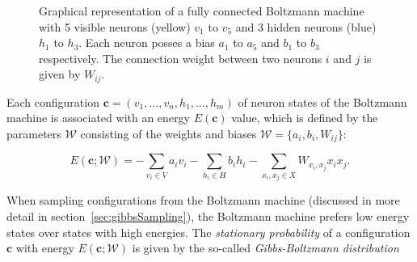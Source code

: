 \begin{figure}[H]
    \centering
    \caption[Fully Connected Boltzmann Machine]{Graphical representation of a fully connected Boltzmann machine with 5 visible neurons (yellow) $v_1$ to $v_5$
    and 3 hidden neurons (blue) $h_1$ to $h_3$. Each neuron posses a bias
    $a_1$ to $a_5$ and $b_1$ to $b_3$ respectively. The connection weight between two neurons $i$ and $j$
    is given by $W_{ij}$.}
    \label{fig:boltzmannMachine}
\end{figure}

Each configuration $\bm{c}=(v_1,\dots,v_n,h_1,\dots,h_m)$ of neuron states
of the Boltzmann machine is associated with an energy $E(\bm{c})$ value,
which is defined by the parameters $\mathcal{W}$ consisting of the weights and 
biases $\mathcal{W} = \{a_i, b_i, W_{ij}\}$:

\begin{equation}
  E(\bm{c};\mathcal{W}) = - \sum_{v_i \in V} a_{i}v_{i} - \sum_{h_i \in H} b_{i}h_{i} - \sum_{x_i,x_j \in X} W_{x_i,x_j}x_{i}x_{j}.
\end{equation}

When sampling configurations from the Boltzmann machine (discussed in more detail in section~\ref{sec:gibbsSampling}), the 
Boltzmann machine prefers low energy states over states with high energies. The \textit{stationary probability}
of a configuration $\bm{c}$ with energy $E(\bm{c};\mathcal{W})$ is given by the so-called \textit{Gibbs-Boltzmann distribution} \cite{gibbs_2010}

